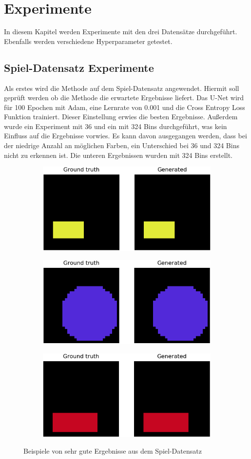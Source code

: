 \chapter{Experimente}
In diesem Kapitel werden Experimente mit den drei Datensätze durchgeführt. Ebenfalls werden verschiedene Hyperparameter getestet.

\section{Spiel-Datensatz Experimente}
Als erstes wird die Methode auf dem Spiel-Datensatz angewendet. Hiermit soll geprüft werden ob die Methode die erwartete
Ergebnisse liefert. Das U-Net wird für 100 Epochen mit Adam, eine Lernrate von 0.001 und die Cross Entropy Loss Funktion trainiert. Dieser
Einstellung erwies die besten Ergebnisse. Außerdem wurde ein Experiment mit 36 und ein mit 324 Bins durchgeführt, was kein Einfluss auf die 
Ergebnisse vorwies. Es kann davon ausgegangen werden, dass bei der niedrige Anzahl an möglichen Farben, ein Unterschied bei 36 und 324 Bins
nicht zu erkennen ist. Die unteren Ergebnissen wurden mit 324 Bins erstellt.

\begin{figure}[H]
  \vspace{1cm}
  \begin{subfigure}
    \centering
    \includegraphics[width=.32\textwidth]{resources/experiments/30.png}
  \end{subfigure}
  \begin{subfigure}
    \centering
    \includegraphics[width=.32\textwidth]{resources/experiments/31.png}
  \end{subfigure}
  \begin{subfigure}
    \centering
    \includegraphics[width=.32\textwidth]{resources/experiments/42.png}
  \end{subfigure}
  \caption{Beispiele von sehr gute Ergebnisse aus dem Spiel-Datensatz}
  \label{image:gute-ergebnisse-toy-dataset}
\end{figure}


